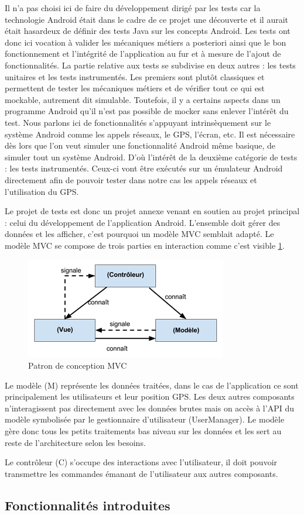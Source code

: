             Il n’a pas choisi ici de faire du développement dirigé par les tests car la technologie Android était dans le cadre de ce projet une découverte et il aurait était hasardeux de définir des tests Java sur les concepts Android. Les tests ont donc ici vocation à valider les mécaniques métiers a posteriori ainsi que le bon fonctionnement et l’intégrité de l’application au fur et à mesure de l’ajout de fonctionnalités. La partie relative aux tests se subdivise en deux autres : les tests unitaires et les tests instrumentés. Les premiers sont plutôt classiques et permettent de tester les mécaniques métiers et de vérifier tout ce qui est mockable, autrement dit simulable. Toutefois, il y a certains aspects dans un programme Android qu’il n’est pas possible de mocker sans enlever l’intérêt du test. Nous parlons ici de fonctionnalités s’appuyant intrinsèquement sur le système Android comme les appels réseaux, le GPS, l’écran, etc. Il est nécessaire dès lors que l’on veut simuler une fonctionnalité Android même basique, de simuler tout un système Android. D’où l’intérêt de la deuxième catégorie de tests : les tests instrumentés. Ceux-ci vont être exécutés sur un émulateur Android directement afin de pouvoir tester dans notre cas les appels réseaux et l’utilisation du GPS.

            Le projet de tests est donc un projet annexe venant en soutien au projet principal : celui du développement de l’application Android. L’ensemble doit gérer des données et les afficher, c’est pourquoi un modèle MVC semblait adapté. Le modèle MVC se compose de trois parties en interaction comme c’est visible \ref{mvc}. 

            \begin{figure}[H]
                \centering
                \includegraphics{./img/mvc.png}
                \caption{Patron de conception MVC}
                \label{mvc}
            \end{figure}

            Le modèle (M) représente les données traitées, dans le cas de l’application ce sont principalement les utilisateurs et leur position GPS. Les deux autres composants n’interagissent pas directement avec les données brutes mais on accès à l’API du modèle symbolisée par le gestionnaire d’utilisateur (UserManager). Le modèle gère donc tous les petits traitements bas niveau sur les données et les sert au reste de l’architecture selon les besoins.

            Le contrôleur (C) s’occupe des interactions avec l’utilisateur, il doit pouvoir transmettre les commandes émanant de l’utilisateur aux autres composants.

    \subsection{Fonctionnalités introduites}

